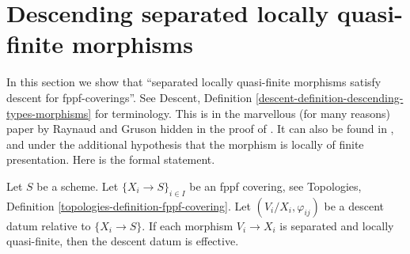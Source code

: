 \section{Descending separated locally quasi-finite morphisms}
\label{section-separated-locally-quasi-finite}

\noindent
In this section we show that ``separated locally quasi-finite morphisms
satisfy descent for fppf-coverings''. See Descent, Definition
\ref{descent-definition-descending-types-morphisms} for terminology.
This is in the marvellous
(for many reasons) paper by Raynaud and Gruson hidden in the proof
of \cite[Lemma 5.7.1]{GruRay}.
It can also be found in \cite{Murre-representation}, and
\cite[Expos\'e X, Lemma 5.4]{SGA3}
under the additional
hypothesis that the morphism is locally of finite presentation.
Here is the formal statement.

\begin{lemma}
\label{lemma-separated-locally-quasi-finite-morphisms-fppf-descend}
Let $S$ be a scheme.
Let $\{X_i \to S\}_{i\in I}$ be an fppf covering, see
Topologies, Definition \ref{topologies-definition-fppf-covering}.
Let $(V_i/X_i, \varphi_{ij})$ be a descent datum
relative to $\{X_i \to S\}$. If each morphism
$V_i \to X_i$ is separated and locally quasi-finite,
then the descent datum is effective.
\end{lemma}

